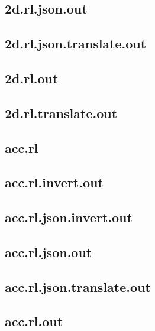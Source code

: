 \subsection{2d.rl.json.out}
\label{app:2d_rl.json.out}

\subsection{2d.rl.json.translate.out}
\label{app:2d_rl.json.translate.out}

\subsection{2d.rl.out}
\label{app:2d_rl.out}

\subsection{2d.rl.translate.out}
\label{app:2d_rl.translate.out}

\subsection{acc.rl}
\label{app:acc_rl}

\subsection{acc.rl.invert.out}
\label{app:acc_rl.invert.out}

\subsection{acc.rl.json.invert.out}
\label{app:acc_rl.json.invert.out}

\subsection{acc.rl.json.out}
\label{app:acc_rl.json.out}

\subsection{acc.rl.json.translate.out}
\label{app:acc_rl.json.translate.out}

\subsection{acc.rl.out}
\label{app:acc_rl.out}

